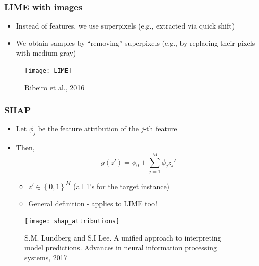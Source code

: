 \begin{frame}
  \frametitle{LIME with images}
  \begin{itemize}
  \item Instead of features, we use superpixels (e.g., extracted via quick shift)
  \item We obtain samples by ``removing'' superpixels (e.g., by replacing their
    pixels with medium gray)
  \end{itemize}
  \begin{figure}
    \texttt{[image: LIME]}
    \caption{\footnotesize Ribeiro et al., 2016}
  \end{figure}
\end{frame}

\begin{frame}
  \frametitle{SHAP}
  \begin{itemize}
  \item Let $\phi_j$ be the feature attribution of the $j$-th feature
  \item Then,
    \begin{equation*}
      g(z') = \phi_0 + \sum\limits_{j = 1}^{M}\phi_jz_j'
    \end{equation*}
    \begin{itemize}
    \item $z' \in \left\{0, 1\right\}^M$ (all 1's for the target instance)
    \item General definition - applies to LIME too!
    \end{itemize}
  \end{itemize}
  \begin{figure}
    \texttt{[image: shap\_attributions]}
    \caption{\footnotesize S.M. Lundberg and S.I Lee. A unified approach to
        interpreting model predictions. Advances in neural information
        processing systems, 2017}
  \end{figure}
\end{frame}

